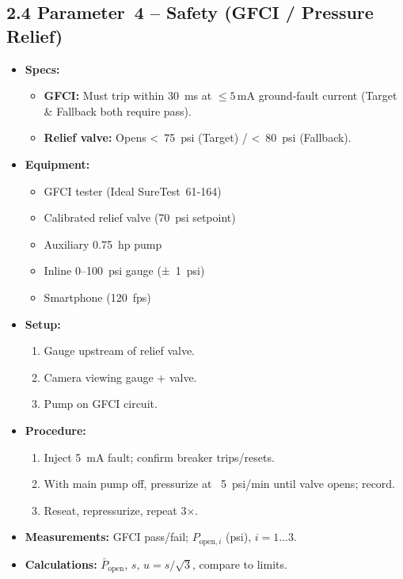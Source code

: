 \documentclass[12pt]{article}
\begin{document}
\subsection*{2.4 Parameter 4 – Safety (GFCI / Pressure Relief)}
\begin{itemize}[leftmargin=*]
  \item \textbf{Specs:}
    \begin{itemize}[leftmargin=1.5em]
      \item \textbf{GFCI:} Must trip within 30 ms at $\le5\,\mathrm{mA}$ ground‑fault current (Target \& Fallback both require pass).
      \item \textbf{Relief valve:} Opens < 75 psi (Target) / < 80 psi (Fallback).
    \end{itemize}
  \item \textbf{Equipment:}
    \begin{itemize}[leftmargin=1.5em]
      \item GFCI tester (Ideal SureTest 61‑164)  
      \item Calibrated relief valve (70 psi setpoint)  
      \item Auxiliary \SI{0.75}{hp} pump  
      \item Inline 0–100 psi gauge (± 1 psi)  
      \item Smartphone (120 fps)
    \end{itemize}
  \item \textbf{Setup:}
    \begin{enumerate}[label=\arabic*., leftmargin=*]
      \item Gauge upstream of relief valve.  
      \item Camera viewing gauge + valve.
      \item Pump on GFCI circuit.
    \end{enumerate}
  \item \textbf{Procedure:}
    \begin{enumerate}[label=\arabic*., leftmargin=*]
      \item Inject 5 mA fault; confirm breaker trips/resets.  
      \item With main pump off, pressurize at ~5 psi/min until valve opens; record.  
      \item Reseat, repressurize, repeat 3×.
    \end{enumerate}
  \item \textbf{Measurements:} GFCI pass/fail; $P_{\mathrm{open},i}$ (psi), $i=1\ldots3$.
  \item \textbf{Calculations:} $\bar P_{\mathrm{open}},\,s,\,u=s/\sqrt{3}$, compare to limits.
\end{itemize}
\end{document}
